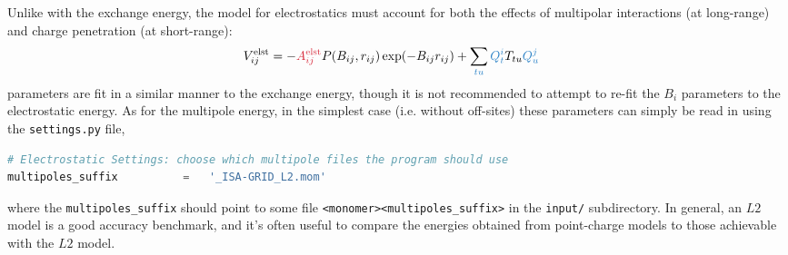Unlike with the exchange energy, the model for electrostatics must account for
both the effects of multipolar interactions (at long-range) and charge
penetration (at short-range):
%
\begin{align}
\velst_{ij} &= -\textcolor{fit}{\Ael{ij}} P(\B, r_{ij}) \exp(-\B r_{ij}) + \vmultipolecolor
\end{align}
%
 parameters are fit in a similar manner to the exchange energy, though
it is not recommended to attempt to re-fit the $B_i$ parameters to the
electrostatic energy. As for the multipole energy, in the simplest case (i.e.
without off-sites) these
parameters can simply be read in using the \verb|settings.py| file,
%
\begin{lstlisting}[language=python]
# Electrostatic Settings: choose which multipole files the program should use
multipoles_suffix          =   '_ISA-GRID_L2.mom'
\end{lstlisting}
%
where the \verb|multipoles_suffix| should point to some file
\verb|<monomer><multipoles_suffix>| in the \verb|input/| subdirectory.
In general, an $L2$ model is a good accuracy benchmark, and it's often useful
to compare the energies obtained from point-charge
models to those achievable with the $L2$ model.

